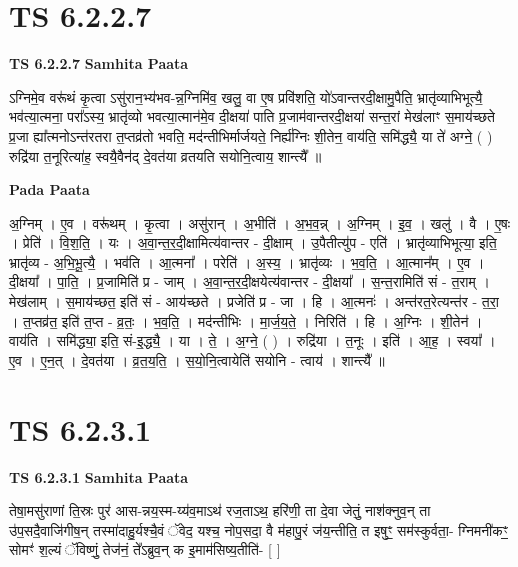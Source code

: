 \documentclass[17pt]{extarticle}
\begin{document}
\section{ TS 6.2.2.7 }

\textbf{TS 6.2.2.7 } \newline
\textbf{Samhita Paata} \newline

ऽग्निमे॒व वरू॑थं कृ॒त्वा ऽसु॑रान॒भ्य॑भव-न्न॒ग्निमि॑व॒ खलु॒ वा ए॒ष प्रवि॑शति॒ यो॑ऽवान्तरदी॒क्षामु॒पैति॒ भ्रातृ॑व्याभिभूत्यै॒ भव॑त्या॒त्मना॒ परा᳚ऽस्य॒ भ्रातृ॑व्यो भवत्या॒त्मान॑मे॒व दी॒क्षया॑ पाति प्र॒जाम॑वान्तरदी॒क्षया॑ सन्त॒रां मेख॑लाꣳ स॒माय॑च्छते प्र॒जा ह्या᳚त्मनोऽन्त॑रतरा त॒प्तव्र॑तो भवति॒ मद॑न्तीभिर्मार्जयते॒ निर्ह्य॑ग्निः शी॒तेन॒ वाय॑ति॒ समि॑द्ध्यै॒ या ते॑ अग्ने॒ ( ) रुद्रि॑या त॒नूरित्या॑ह॒ स्वयै॒वैन॑द् दे॒वत॑या व्रतयति सयोनि॒त्वाय॒ शान्त्यै᳚ ॥ \newline

\textbf{Pada Paata} \newline

अ॒ग्निम् । ए॒व । वरू॑थम् । कृ॒त्वा । असु॑रान् । अ॒भीति॑ । अ॒भ॒व॒न्न् । अ॒ग्निम् । इ॒व॒ । खलु॑ । वै । ए॒षः । प्रेति॑ । वि॒श॒ति॒ । यः । अ॒वा॒न्त॒र॒दी॒क्षामित्य॑वान्तर - दी॒क्षाम् । उ॒पैतीत्यु॑प - एति॑ । भ्रातृ॑व्याभिभूत्या॒ इति॒ भ्रातृ॑व्य - अ॒भि॒भू॒त्यै॒ । भव॑ति । आ॒त्मना᳚ । परेति॑ । अ॒स्य॒ । भ्रातृ॑व्यः । भ॒व॒ति॒ । आ॒त्मान᳚म् । ए॒व । दी॒क्षया᳚ । पा॒ति॒ । प्र॒जामिति॑ प्र - जाम् । अ॒वा॒न्त॒र॒दी॒क्षयेत्य॑वान्तर - दी॒क्षया᳚ । स॒न्त॒रामिति॑ सं - त॒राम् । मेख॑लाम् । स॒माय॑च्छत॒ इति॑ सं - आय॑च्छते । प्रजेति॑ प्र - जा । हि । आ॒त्मनः॑ । अन्त॑रत॒रेत्यन्त॑र - त॒रा॒ । त॒प्तव्र॑त॒ इति॑ त॒प्त - व्र॒तः॒ । भ॒व॒ति॒ । मद॑न्तीभिः । मा॒र्ज॒य॒ते॒ । निरिति॑ । हि । अ॒ग्निः । शी॒तेन॑ । वाय॑ति । समि॑द्ध्या॒ इति॒ सं-इ॒द्ध्यै॒ । या । ते॒ । अ॒ग्ने॒ ( ) । रुद्रि॑या । त॒नूः । इति॑ । आ॒ह॒ । स्वया᳚ । ए॒व । ए॒न॒त् । दे॒वत॑या । व्र॒त॒य॒ति॒ । स॒यो॒नि॒त्वायेति॑ सयोनि - त्वाय॑ । शान्त्यै᳚ ॥  \newline





\section{ TS 6.2.3.1 }

\textbf{TS 6.2.3.1 } \newline
\textbf{Samhita Paata} \newline

तेषा॒मसु॑राणां ति॒स्रः पुर॑ आस-न्नय॒स्म-य्य॑व॒माऽथ॑ रज॒ताऽथ॒ हरि॑णी॒ ता दे॒वा जेतुं॒ नाश॑क्नुव॒न् ता उ॑प॒सदै॒वाजि॑गीष॒न् तस्मा॑दाहु॒र्यश्चै॒वं ॅवेद॒ यश्च॒ नोप॒सदा॒ वै म॑हापु॒रं ज॑य॒न्तीति॒ त इषुꣳ॒॒ सम॑स्कुर्वता॒- ग्निमनी॑कꣳ॒॒ सोमꣳ॑ श॒ल्यं ॅविष्णुं॒ तेज॑नं॒ ते᳚ऽब्रुव॒न् क इ॒माम॑सिष्य॒तीति॑- [  ] \newline
\end{document}
